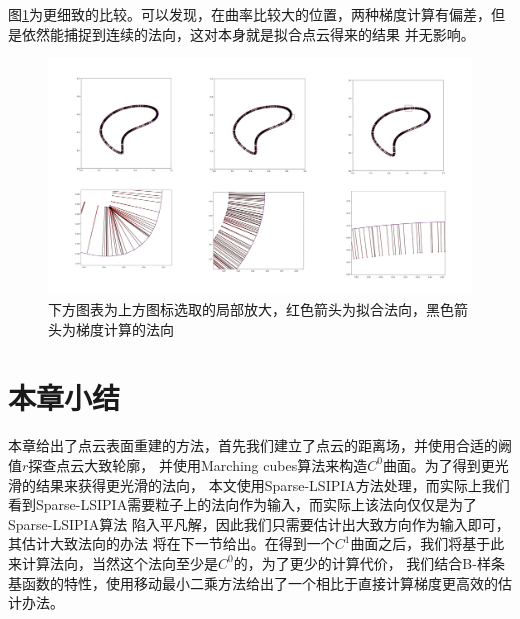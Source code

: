 图\ref{fig:normal_compare_specific}为更细致的比较。可以发现，在曲率比较大的位置，两种梯度计算有偏差，但是依然能捕捉到连续的法向，这对本身就是拟合点云得来的结果
并无影响。
\begin{figure}[htbp]
    \centering
    \includegraphics[scale=0.5]{./images/normal_compare_specific.png}
    \caption[两种法向对比]{下方图表为上方图标选取的局部放大，红色箭头为拟合法向，黑色箭头为梯度计算的法向}
    \label{fig:normal_compare_specific}
\end{figure}
\section{本章小结}
本章给出了点云表面重建的方法，首先我们建立了点云的距离场，并使用合适的阙值$r$探查点云大致轮廓，
并使用Marching cubes算法来构造$C^0$曲面。为了得到更光滑的结果来获得更光滑的法向，
本文使用Sparse-LSIPIA方法处理，而实际上我们看到Sparse-LSIPIA需要粒子上的法向作为输入，而实际上该法向仅仅是为了Sparse-LSIPIA算法
陷入平凡解，因此我们只需要估计出大致方向作为输入即可，其估计大致法向的办法
将在下一节给出。在得到一个$C^1$曲面之后，我们将基于此来计算法向，当然这个法向至少是$C^0$的，为了更少的计算代价，
我们结合B-样条基函数的特性，使用移动最小二乘方法给出了一个相比于直接计算梯度更高效的估计办法。



